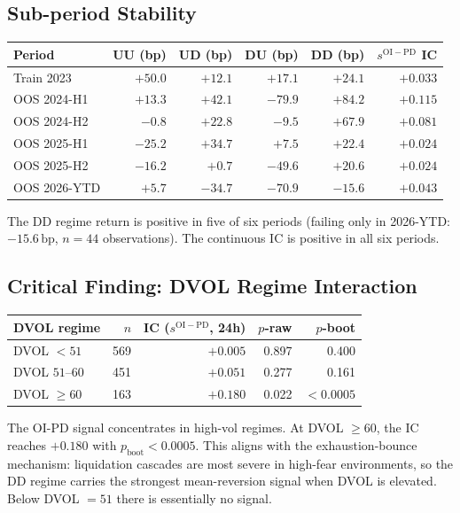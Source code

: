 \documentclass[12pt, a4paper]{article}
\theoremstyle{plain}
\theoremstyle{definition}
\newcommand{\bp}{\,\mathrm{bp}}
\begin{document}
\subsection{Sub-period Stability}

\begin{center}
\begin{tabular}{lrrrrr}
\toprule
Period & UU (bp) & UD (bp) & DU (bp) & DD (bp) & $s^{\mathrm{OI-PD}}$ IC \\
\midrule
Train 2023   & $+50.0$ & $+12.1$ & $+17.1$ & $+24.1$ & $+0.033$ \\
OOS 2024-H1  & $+13.3$ & $+42.1$ & $-79.9$ & $+84.2$ & $+0.115$ \\
OOS 2024-H2  & $-0.8$  & $+22.8$ & $-9.5$  & $+67.9$ & $+0.081$ \\
OOS 2025-H1  & $-25.2$ & $+34.7$ & $+7.5$  & $+22.4$ & $+0.024$ \\
OOS 2025-H2  & $-16.2$ & $+0.7$  & $-49.6$ & $+20.6$ & $+0.024$ \\
OOS 2026-YTD & $+5.7$  & $-34.7$ & $-70.9$ & $-15.6$ & $+0.043$ \\
\bottomrule
\end{tabular}
\end{center}

The DD regime return is positive in five of six periods (failing only
in 2026-YTD: $-15.6\bp$, $n = 44$ observations).  The continuous IC
is positive in all six periods.

\subsection{Critical Finding: DVOL Regime Interaction}

\begin{center}
\begin{tabular}{lrrrr}
\toprule
DVOL regime & $n$ & IC ($s^{\mathrm{OI-PD}}$, 24h) & $p$-raw & $p$-boot \\
\midrule
DVOL $< 51$     & 569 & $+0.005$ & 0.897 & 0.400 \\
DVOL $51$--$60$ & 451 & $+0.051$ & 0.277 & 0.161 \\
DVOL $\geq 60$  & 163 & $+0.180$ & 0.022 & $\mathbf{<0.0005}$ \\
\bottomrule
\end{tabular}
\end{center}

The OI-PD signal concentrates in high-vol regimes.  At DVOL $\geq 60$,
the IC reaches $+0.180$ with $p_{\mathrm{boot}} < 0.0005$.  This aligns
with the exhaustion-bounce mechanism: liquidation cascades are most severe
in high-fear environments, so the DD regime carries the strongest
mean-reversion signal when DVOL is elevated.  Below DVOL $= 51$ there is
essentially no signal.
\end{document}
